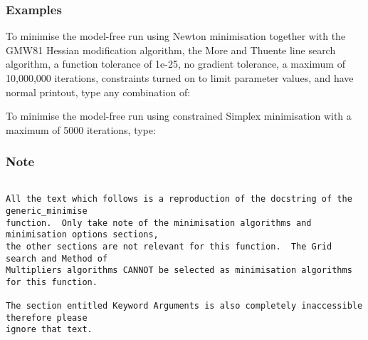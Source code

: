 \subsubsection{Examples}

To minimise the model-free run 
 using Newton minimisation together with the GMW81
Hessian modification algorithm, the More and Thuente line search algorithm, a function
tolerance of 1e-25, no gradient tolerance, a maximum of 10,000,000 iterations, constraints
turned on to limit parameter values, and have normal printout, type any combination of:













To minimise the model-free run 
 using constrained Simplex minimisation with a maximum of
5000 iterations, type:





\subsubsection{Note}

{\footnotesize \begin{verbatim}

All the text which follows is a reproduction of the docstring of the generic_minimise
function.  Only take note of the minimisation algorithms and minimisation options sections,
the other sections are not relevant for this function.  The Grid search and Method of
Multipliers algorithms CANNOT be selected as minimisation algorithms for this function.

The section entitled Keyword Arguments is also completely inaccessible therefore please
ignore that text.

\end{verbatim}}


